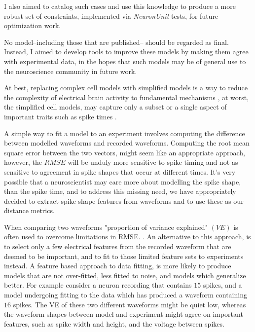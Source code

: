 I also aimed to catalog such cases and use this knowledge to produce a more robust set of constraints, implemented via \emph{NeuronUnit} tests, for future optimization work.

No model--including those that are published-- should be regarded as final.
Instead, I aimed to develop tools to improve these models by making them agree with experimental data, in the hopes that such models may be of general use to the neuroscience community in future work.

At best, replacing complex cell models with simplified models is a way to reduce the complexity of electrical brain activity to fundamental mechanisms \cite{teeter2018generalized}, at worst, the simplified cell models, may capture only a subset or a single aspect of important traits such as spike times \cite{hertag2012approximation}. %

A simple way to fit a model to an experiment involves computing the difference between modelled waveforms and recorded waveforms. Computing the root mean square error between the two vectors, might seem like an appropriate approach, however, the $RMSE$  will be unduly more sensitive to spike timing and not as sensitive to agreement in spike shapes that occur at different times. It's very possible that a neuroscientist may care more about modelling the spike shape, than the spike time, and to address this missing need, we have appropriately decided to extract spike shape features from waveforms and to use these as our distance metrics.

When comparing two waveforms "proportion of variance explained" $(VE)$ is often used to overcome limitations in RMSE. \cite{schoppe2016measuring}. An alternative to this approach, is to select only a few electrical features from the recorded waveform that are deemed to be important, and to fit to those limited feature sets to experiments instead. A feature based approach to data fitting, is more likely to produce models that are not over-fitted, less fitted to noise, and models which generalize better. For example consider a neuron recording that contains $15$ spikes, and a model undergoing fitting to the data which has produced a waveform containing $16$ spikes. The VE of these two different waveforms might be quiet low, whereas the waveform shapes between model and experiment might agree on important features, such as spike width and height, and the voltage between spikes.


